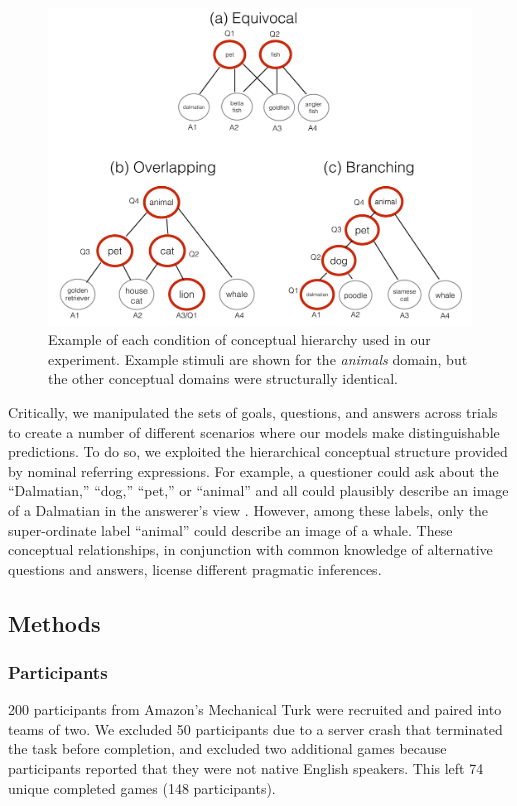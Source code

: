 \documentclass[11pt, floatsintext]{apa6}
\begin{document}
\begin{figure}[th!]
\begin{center}
\includegraphics[scale = .5]{Exp1/hierarchyStructureExamples.pdf}
\end{center}
\caption{\footnotesize  Example of each condition of conceptual hierarchy used in our experiment. Example stimuli are shown for the \emph{animals} domain, but the other conceptual domains were structurally identical.}
\label{fig:hierarchyStructures}
\end{figure}

Critically, we manipulated the sets of goals, questions, and answers across trials to create a number of different scenarios where our models make distinguishable predictions.
To do so, we exploited the hierarchical conceptual structure provided by nominal referring expressions.
For example, a questioner could ask about the ``Dalmatian,'' ``dog,'' ``pet,'' or ``animal'' and all could plausibly describe an image of a Dalmatian in the answerer's view \cite{Brown58_HowShallAThingBeCalled,GrafEtAl16_BasicLevel}. 
However, among these labels, only the super-ordinate label ``animal'' could describe an image of a whale.
These conceptual relationships, in conjunction with common knowledge of alternative questions and answers, license different pragmatic inferences.



\subsection{Methods}
\subsubsection{Participants} 
200 participants from Amazon's Mechanical Turk were recruited and paired into teams of two.
We excluded 50 participants due to a server crash that terminated the task before completion, and
excluded two additional games because participants reported that they were not native English speakers. 
This left 74 unique completed games (148 participants).
\end{document}

